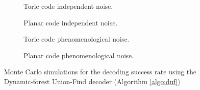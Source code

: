 \begin{figure}[htbp]
  \centering
  \begin{subfigure}[b]{0.49\textwidth}
      \begin{adjustbox}{Clip=0 1em 0 0}
        
      \end{adjustbox}
      \caption{Toric code independent noise.}
  \end{subfigure}
  \begin{subfigure}[b]{0.49\textwidth}
      \begin{adjustbox}{Clip=0 1em 0 0}
        
      \end{adjustbox}
      \caption{Planar code independent noise.}
  \end{subfigure}
  \begin{subfigure}[b]{0.49\textwidth}
      \begin{adjustbox}{Clip=0 1em 0 0}
        
      \end{adjustbox}
      \caption{Toric code phenomenological noise.}
  \end{subfigure}
  \begin{subfigure}[b]{0.49\textwidth}
      \begin{adjustbox}{Clip=0 1em 0 0}
        
      \end{adjustbox}
      \caption{Planar code phenomenological noise.}
  \end{subfigure}
  \caption{Monte Carlo simulations for the decoding success rate using the Dynamic-forest Union-Find decoder (Algorithm \ref{algo:duf})}
  \label{fig:threshold_duf}
\end{figure}


